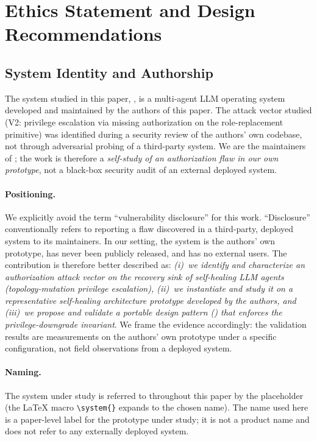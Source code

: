 
\section{Ethics Statement and Design Recommendations}
\label{sec:ethics}

\subsection{System Identity and Authorship}

The system studied in this paper, \system{}, is a multi-agent LLM operating system developed and maintained by the authors of this paper. The attack vector studied (V2:  privilege escalation via missing authorization on the role-replacement primitive) was identified during a security review of the authors' own codebase, not through adversarial probing of a third-party system. We are the maintainers of \system{}; the work is therefore a \emph{self-study of an authorization flaw in our own prototype}, not a black-box security audit of an external deployed system.

\paragraph{Positioning.}
We explicitly avoid the term ``vulnerability disclosure'' for this work. ``Disclosure'' conventionally refers to reporting a flaw discovered in a third-party, deployed system to its maintainers. In our setting, the system is the authors' own prototype, has never been publicly released, and has no external users. The contribution is therefore better described as: \emph{(i)~we identify and characterize an authorization attack vector on the recovery sink of self-healing LLM agents (topology-mutation privilege escalation), (ii)~we instantiate and study it on a representative self-healing architecture prototype developed by the authors, and (iii)~we propose and validate a portable design pattern (\reauthgate{}) that enforces the privilege-downgrade invariant}. We frame the evidence accordingly: the validation results are measurements on the authors' own prototype under a specific configuration, not field observations from a deployed system.

\paragraph{Naming.}
The system under study is referred to throughout this paper by the placeholder \system{} (the LaTeX macro \verb|\system{}| expands to the chosen name). The name used here is a paper-level label for the prototype under study; it is not a product name and does not refer to any externally deployed system.

